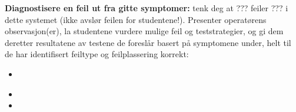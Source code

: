 \vskip 10pt


\noindent
{\bf Diagnostisere en feil ut fra gitte symptomer:} tenk deg at ??? feiler ??? i dette systemet (ikke avslør feilen for studentene!). Presenter operatørens observasjon(er), la studentene vurdere mulige feil og teststrategier, og gi dem deretter resultatene av testene de foreslår basert på symptomene under, helt til de har identifisert feiltype og feilplassering korrekt:

\begin{itemize}
\item{} {\it }
\item{} 
\item{} 
\end{itemize}


